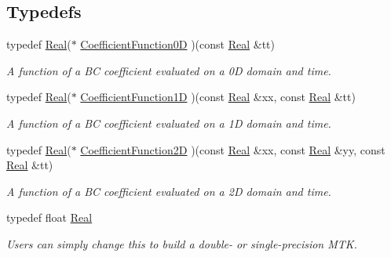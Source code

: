 \subsection*{Typedefs}
\begin{DoxyCompactItemize}
\item 
typedef \hyperlink{group__c01-roots_gac080bbbf5cbb5502c9f00405f894857d}{Real}($\ast$ \hyperlink{group__c07-mim__ops_ga04276745b4d511f0f3c636d6e0df7c2d}{Coefficient\+Function0\+D} )(const \hyperlink{group__c01-roots_gac080bbbf5cbb5502c9f00405f894857d}{Real} \&tt)
\begin{DoxyCompactList}\small\item\em A function of a B\+C coefficient evaluated on a 0\+D domain and time. \end{DoxyCompactList}\item 
typedef \hyperlink{group__c01-roots_gac080bbbf5cbb5502c9f00405f894857d}{Real}($\ast$ \hyperlink{group__c07-mim__ops_gaa79593eeb6676d6011db339e01983909}{Coefficient\+Function1\+D} )(const \hyperlink{group__c01-roots_gac080bbbf5cbb5502c9f00405f894857d}{Real} \&xx, const \hyperlink{group__c01-roots_gac080bbbf5cbb5502c9f00405f894857d}{Real} \&tt)
\begin{DoxyCompactList}\small\item\em A function of a B\+C coefficient evaluated on a 1\+D domain and time. \end{DoxyCompactList}\item 
typedef \hyperlink{group__c01-roots_gac080bbbf5cbb5502c9f00405f894857d}{Real}($\ast$ \hyperlink{group__c07-mim__ops_ga0ff293d1fd754006d64a3588971dc5c4}{Coefficient\+Function2\+D} )(const \hyperlink{group__c01-roots_gac080bbbf5cbb5502c9f00405f894857d}{Real} \&xx, const \hyperlink{group__c01-roots_gac080bbbf5cbb5502c9f00405f894857d}{Real} \&yy, const \hyperlink{group__c01-roots_gac080bbbf5cbb5502c9f00405f894857d}{Real} \&tt)
\begin{DoxyCompactList}\small\item\em A function of a B\+C coefficient evaluated on a 2\+D domain and time. \end{DoxyCompactList}\item 
typedef float \hyperlink{group__c01-roots_gac080bbbf5cbb5502c9f00405f894857d}{Real}
\begin{DoxyCompactList}\small\item\em Users can simply change this to build a double-\/ or single-\/precision M\+T\+K. \end{DoxyCompactList}\end{DoxyCompactItemize}
